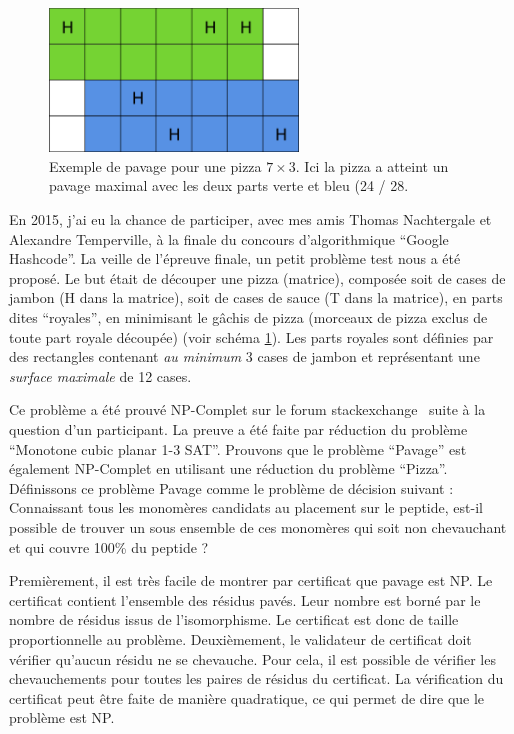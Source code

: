 \begin{figure}[!ht]
  \begin{center}
    \includegraphics[width=250px]{Figures/s2m/pavage/pizza.png}
    \caption{\label{pizza}Exemple de pavage pour une pizza $7 \times 3$.
    Ici la pizza a atteint un pavage maximal avec les deux parts verte et bleu (24 / 28.}
  \end{center}
\end{figure}

En 2015, j'ai eu la chance de participer, avec mes amis Thomas Nachtergale et Alexandre Temperville, à la finale du concours d'algorithmique ``Google Hashcode''.
La veille de l'épreuve finale, un petit problème test nous a été proposé.
Le but était de découper une pizza (matrice), composée soit de cases de jambon (H dans la matrice), soit de cases de sauce (T dans la matrice), en parts dites ``royales'', en minimisant le gâchis de pizza (morceaux de pizza exclus de toute part royale découpée) (voir schéma \ref{pizza}).
Les parts royales sont définies par des rectangles contenant \textit{au minimum} 3 cases de jambon et représentant une \textit{surface maximale} de 12 cases.

Ce problème a été prouvé NP-Complet sur le forum stackexchange~\cite{de_biasi_complexity_2015} suite à la question d'un participant.
La preuve a été faite par réduction du problème ``Monotone cubic planar 1-3 SAT''.
Prouvons que le problème ``Pavage'' est également NP-Complet en utilisant une réduction du problème ``Pizza''.
Définissons ce problème Pavage comme le problème de décision suivant : Connaissant tous les monomères candidats au placement sur le peptide, est-il possible de trouver un sous ensemble de ces monomères qui soit non chevauchant et qui couvre 100\% du peptide ?

Premièrement, il est très facile de montrer par certificat que pavage est NP.
Le certificat contient l'ensemble des résidus pavés.
Leur nombre est borné par le nombre de résidus issus de l'isomorphisme.
Le certificat est donc de taille proportionnelle au problème.
Deuxièmement, le validateur de certificat doit vérifier qu'aucun résidu ne se chevauche.
Pour cela, il est possible de vérifier les chevauchements pour toutes les paires de résidus du certificat.
La vérification du certificat peut être faite de manière quadratique, ce qui permet de dire que le problème est NP.

